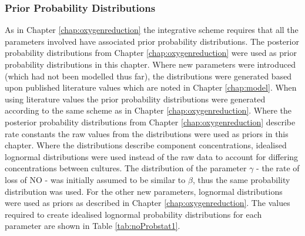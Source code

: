 \subsubsection{Prior Probability Distributions}
As in Chapter \ref{chap:oxygenreduction} the integrative scheme requires that all the parameters involved have associated prior probability distributions. The posterior probability distributions from Chapter \ref{chap:oxygenreduction} were used as prior probability distributions in this chapter. Where new parameters were introduced (which had not been modelled thus far), the distributions were generated based upon published literature values which are noted in Chapter \ref{chap:model}. When using literature values the prior probability distributions were generated according to the same scheme as in Chapter \ref{chap:oxygenreduction}. Where the posterior probability distributions from Chapter \ref{chap:oxygenreduction} describe rate constants the raw values from the distributions were used as priors in this chapter. Where the distributions describe component concentrations, idealised lognormal distributions were used instead of the raw data to account for differing concentrations between cultures. The distribution of the parameter $\gamma$ - the rate of loss of NO - was initially assumed to be similar to $\beta$, thus the same probability distribution was used. For the other new parameters, lognormal distributions were used as priors as described in Chapter \ref{chap:oxygenreduction}. The values required to create idealised lognormal probability distributions for each parameter are shown in Table \ref{tab:noProbstat1}.

